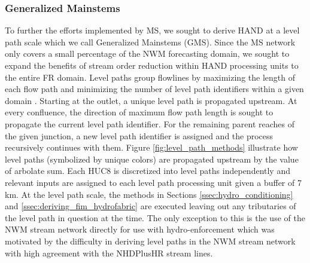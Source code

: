 \subsubsection{Generalized Mainstems}
\label{sssec:generalized_mainstems}
%
To further the efforts implemented by MS, we sought to derive HAND at a level path scale which we call Generalized Mainstems (GMS).
Since the MS network only covers a small percentage of the NWM forecasting domain, we sought to expand the benefits of stream order reduction within HAND processing units to the entire FR domain.
Level paths group flowlines by maximizing the length of each flow path and minimizing the number of level path identifiers within a given domain \cite{moore2019user,mckay2012nhdplus}. 
Starting at the outlet, a unique level path is propagated upstream. 
At every confluence, the direction of maximum flow path length is sought to propagate the current level path identifier.
For the remaining parent reaches of the given junction, a new level path identifier is assigned and the process recursively continues with them.
Figure \ref{fig:level_path_methods} illustrate how level paths (symbolized by unique colors) are propagated upstream by the value of arbolate sum.
Each HUC8 is discretized into level paths independently and relevant inputs are assigned to each level path processing unit given a buffer of 7 km.
At the level path scale, the methods in Sections \ref{ssec:hydro_conditioning} and \ref{ssec:deriving_fim_hydrofabric} are executed leaving out any tributaries of the level path in question at the time.
The only exception to this is the use of the NWM stream network directly for use with hydro-enforcement which was motivated by the difficulty in deriving level paths in the NWM stream network with high agreement with the NHDPlusHR stream lines.

